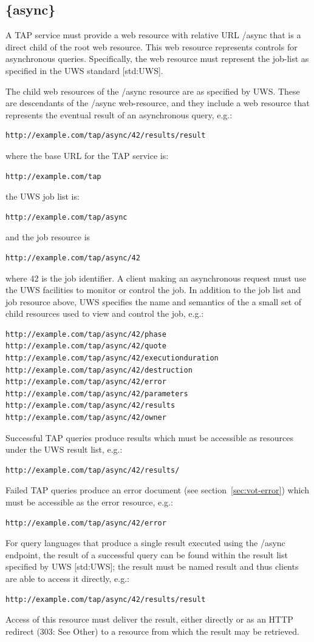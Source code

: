 \documentclass[11pt,letter]{ivoa}
\begin{document}
\subsection{\{async\}}
\label{sec:tap-async}

A TAP service must provide a web resource with relative URL /async that is a 
direct child of the root web resource. This web resource represents controls for 
asynchronous queries. Specifically, the web resource must represent the job-list 
as specified in the UWS standard [std:UWS].

The child web resources of the /async resource are as specified by UWS. These 
are descendants of the /async web-resource, and they include a web resource that 
represents the eventual result of an asynchronous query, e.g.:
\begin{verbatim}
http://example.com/tap/async/42/results/result
\end{verbatim}
where the base URL for the TAP service is:
\begin{verbatim}
http://example.com/tap
\end{verbatim}
the UWS job list is:
\begin{verbatim}
http://example.com/tap/async
\end{verbatim}
and the job resource is
\begin{verbatim}
http://example.com/tap/async/42
\end{verbatim}
where 42 is the job identifier. A client making an asynchronous request must use 
the UWS facilities to monitor or control the job. In addition to the job list 
and job resource above, UWS specifies the name and semantics of the a small set 
of child resources used to view and control the job, e.g.:
\begin{verbatim}
http://example.com/tap/async/42/phase
http://example.com/tap/async/42/quote
http://example.com/tap/async/42/executionduration
http://example.com/tap/async/42/destruction
http://example.com/tap/async/42/error
http://example.com/tap/async/42/parameters
http://example.com/tap/async/42/results
http://example.com/tap/async/42/owner
\end{verbatim}
Successful TAP queries produce results which must be accessible as  resources 
under the UWS result list, e.g.:
\begin{verbatim}
http://example.com/tap/async/42/results/
\end{verbatim}
Failed TAP queries produce an error document (see section~\ref{sec:vot-error}) which must be accessible 
as the error resource, e.g.:
\begin{verbatim}
http://example.com/tap/async/42/error
\end{verbatim}
For query languages that produce a single result executed using the /async 
endpoint, the result of a successful query can be found within the result list 
specified by UWS [std:UWS]; the result must be named result and thus clients are able 
to access it directly, e.g.:
\begin{verbatim}
http://example.com/tap/async/42/results/result
\end{verbatim}
Access of this resource must deliver the result, either directly or as an HTTP 
redirect (303: See Other) to a resource from which the result may be retrieved.
\end{document}
